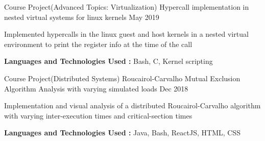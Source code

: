 

\begin{cventries}

  \cventry
    {Course Project(Advanced Topics: Virtualization)} %
    {Hypercall implementation in nested virtual systems for linux kernels} %
    {} %
    {May 2019} %
    {
      \begin{cvitems}
      \item{Implemented hypercalls in the linux guest and host kernels in a nested virtual environment to print the register info at the time of the call}
      \item{\textbf{Languages and Technologies Used :} Bash, C, Kernel scripting}
      \end{cvitems}
    }

  \cventry
    {Course Project(Distributed Systems)} %
    {Roucairol-Carvalho Mutual Exclusion Algorithm Analysis with varying simulated loads} %
    {} %
    {Dec 2018} %
    {
      \begin{cvitems}
      \item{Implementation and visual analysis of a distributed Roucairol-Carvalho algorithm with varying inter-execution times and critical-section times}
      \item{\textbf{Languages and Technologies Used :} Java, Bash, ReactJS, HTML, CSS}
      \end{cvitems}
    }


\end{cventries}
